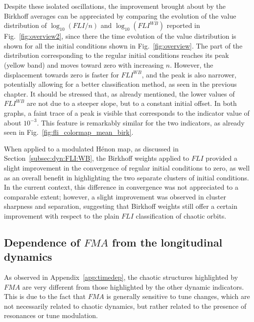 Despite these isolated oscillations, the improvement brought about by the Birkhoff averages can be appreciated by comparing the evolution of the value distribution of $\log_{10}(FLI/n)$ and $\log_{10}(FLI^{WB})$ reported in Fig.~\ref{fig:overview2}, since there the time evolution of the value distribution is shown for all the initial conditions shown in Fig.~\ref{fig:overview}. The part of the distribution corresponding to the regular initial conditions reaches its peak (yellow band) and moves toward zero with increasing $n$. However, the displacement towards zero is faster for $FLI^{WB}$, and the peak is also narrower, potentially allowing for a better classification method, as seen in the previous chapter. It should be stressed that, as already mentioned, the lower values of $FLI^{WB}$ are not due to a steeper slope, but to a constant initial offset. In both graphs, a faint trace of a peak is visible that corresponds to the indicator value of about $10^{-3}$. This feature is remarkably similar for the two indicators, as already seen in Fig.~\ref{fig:fli_colormap_mean_birk}.

When applied to a modulated Hénon map, as discussed in Section~\ref{subsec:dyn:FLI:WB}, the Birkhoff weights applied to $FLI$ provided a slight improvement in the convergence of regular initial conditions to zero, as well as an overall benefit in highlighting the two separate clusters of initial conditions. In the current context, this difference in convergence was not appreciated to a comparable extent; however, a slight improvement was observed in cluster sharpness and separation, suggesting that Birkhoff weights still offer a certain improvement with respect to the plain $FLI$ classification of chaotic orbits. 

\subsection{Dependence of $FMA$ from the longitudinal dynamics}

As observed in Appendix~\ref{app:timedep}, the chaotic structures highlighted by $FMA$ are very different from those highlighted by the other dynamic indicators. This is due to the fact that $FMA$ is generally sensitive to tune changes, which are not necessarily related to chaotic dynamics, but rather related to the presence of resonances or tune modulation.

